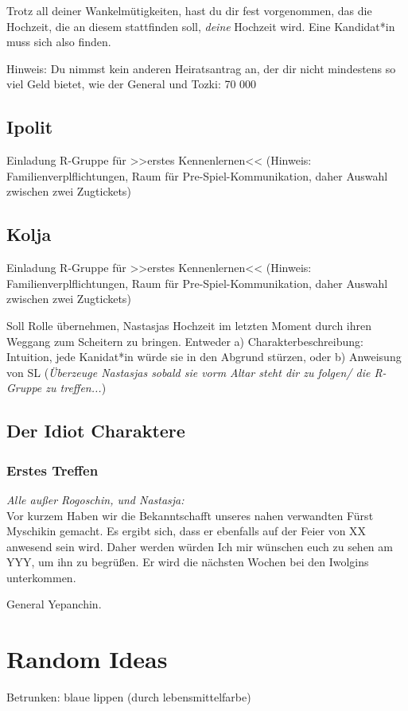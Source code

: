 \documentclass[12pt, a4paper, openany]{report}
\begin{document}
\begin{itemize}
Trotz all deiner Wankelmütigkeiten, hast du dir fest vorgenommen, das die
Hochzeit, die an diesem stattfinden soll, \emph{deine} Hochzeit wird. Eine
Kandidat*in muss sich also finden.

Hinweis: Du nimmst kein anderen Heiratsantrag an, der dir nicht mindestens so
viel Geld bietet, wie der General und Tozki: 70 000

\section{Ipolit} 
Einladung R-Gruppe für >>erstes Kennenlernen<< (Hinweis:
Familienverplflichtungen, Raum für Pre-Spiel-Kommunikation, daher Auswahl
zwischen zwei Zugtickets)

\section{Kolja} 
Einladung R-Gruppe für >>erstes Kennenlernen<< (Hinweis:
Familienverplflichtungen, Raum für Pre-Spiel-Kommunikation, daher Auswahl
zwischen zwei Zugtickets)

Soll Rolle übernehmen, Nastasjas Hochzeit im letzten Moment durch ihren Weggang
zum Scheitern zu bringen. Entweder a) Charakterbeschreibung: Intuition, jede
Kanidat*in würde sie in den Abgrund stürzen, oder b) Anweisung von SL
(\emph{Überzeuge Nastasjas sobald sie vorm Altar steht dir zu folgen/ die
R-Gruppe zu treffen...})

\section{Der Idiot Charaktere}
\subsection{Erstes Treffen} 
\emph{Alle außer Rogoschin, und Nastasja:}\\
Vor kurzem Haben wir die Bekanntschafft unseres nahen verwandten Fürst
Myschikin gemacht. Es ergibt sich, dass er ebenfalls auf der Feier von XX
anwesend sein wird. Daher werden würden Ich mir wünschen euch zu sehen am YYY,
um ihn zu begrüßen. Er wird die nächsten Wochen bei den Iwolgins unterkommen. 

General Yepanchin.

\chapter{Random Ideas} 
Betrunken: blaue lippen (durch lebensmittelfarbe)


\end{itemize}
\end{document}
